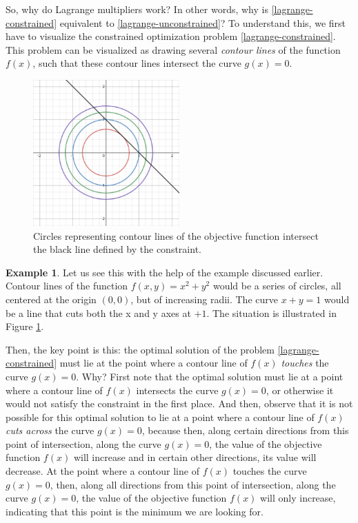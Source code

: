 \documentclass[a4paper]{article}
\theoremstyle{definition}
\newtheorem{example}{Example}[section]
\begin{document}
So, why do Lagrange multipliers work?
In other words, why is \eqref{lagrange-constrained} equivalent to \eqref{lagrange-unconstrained}?
To understand this, we first have to visualize the constrained optimization problem \eqref{lagrange-constrained}.
This problem can be visualized as drawing several \textit{contour lines} of the function $f(x)$, such that these contour lines intersect the curve $g(x) = 0$.

\begin{figure}
	\centering
	\label{lagrange-visualization}
	\includegraphics[width=0.5\textwidth]{figures/lagrange-visualization.png}
	\caption{Circles representing contour lines of the objective function intersect the black line defined by the constraint.}
\end{figure}

\begin{example}
	Let us see this with the help of the example discussed earlier.
	Contour lines of the function $f(x, y) = x^2 + y^2$ would be a series of circles, all centered at the origin $(0, 0)$, but of increasing radii.
	The curve $x + y = 1$ would be a line that cuts both the x and y axes at $+1$.
	The situation is illustrated in Figure \ref{lagrange-visualization}.
\end{example}

Then, the key point is this: the optimal solution of the problem \eqref{lagrange-constrained} must lie at the point where a contour line of $f(x)$ \textit{touches} the curve $g(x) = 0$.
Why?
First note that the optimal solution must lie at a point where a contour line of $f(x)$ intersects the curve $g(x) = 0$, or otherwise it would not satisfy the constraint in the first place.
And then, observe that it is not possible for this optimal solution to lie at a point where a contour line of $f(x)$ \textit{cuts across} the curve $g(x) = 0$, because then, along certain directions from this point of intersection, along the curve $g(x) = 0$, the value of the objective function $f(x)$ will increase and in certain other directions, its value will decrease.
At the point where a contour line of $f(x)$ touches the curve $g(x) = 0$, then, along all directions from this point of intersection, along the curve $g(x) = 0$, the value of the objective function $f(x)$ will only increase, indicating that this point is the minimum we are looking for.
\end{document}
